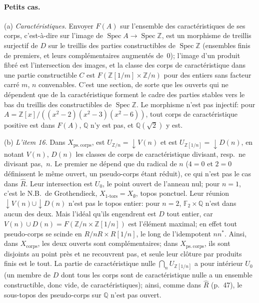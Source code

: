 \paragraph{Petits cas.} (a) \emph{Caractéristiques.} Envoyer $F(A)$ sur l'ensemble des caractéristiques de ses corps, c'est-à-dire sur l'image de $\operatorname{Spec}A\to\operatorname{Spec}\mathbb Z$, est un morphisme de treillis surjectif de $D$ sur le treillis des parties constructibles de $\operatorname{Spec}\mathbb Z$ (ensembles finis de premiers, et leurs complémentaires augmentés de~$0$); l'image d'un produit fibré est l'intersection des images, et la classe des corps de caractéristique dans une partie constructible $C$ est $F(\mathbb Z[1/m]\times\mathbb Z/n)$ pour des entiers sans facteur carré $m$, $n$ convenables. C'est une section, de sorte que les ouverts qui ne dépendent que de la caractéristique forment le cadre des parties stables vers le bas du treillis des constructibles de $\operatorname{Spec}\mathbb Z$. Le morphisme n'est pas injectif: pour $A = \mathbb Z[x]/((x^2-2)(x^2-3)(x^2-6))$, tout corps de caractéristique positive est dans $F(A)$, $\mathbb Q$ n'y est pas, et $\mathbb Q(\sqrt2)$ y est.

(b) \emph{L'item 16.} Dans $X_{\mathrm{ps.\,corps}}$,  est $U_{\mathbb Z/n} = {\downarrow}V(n)$ et  est $U_{\mathbb Z[1/n]} = {\downarrow}D(n)$, en notant $V(n)$, $D(n)$ les classes de corps de caractéristique divisant, resp.\ ne divisant pas,~$n$. Le premier ne dépend que du radical de $n$ ($4 = 0$ et $2 = 0$ définissent le même ouvert, un pseudo-corps étant réduit), ce qui n'est pas le cas dans $\widehat R$. Leur intersection est $U_0$, le point ouvert de l'anneau nul; pour $n = 1$, c'est le N.B.\ de Grothendieck, $X_{1\text{-tors}} = X_\emptyset$, topos ponctuel. Leur réunion ${\downarrow}V(n)\cup{\downarrow}D(n)$ n'est pas le topos entier: pour $n = 2$, $\mathbb F_2\times\mathbb Q$ n'est dans aucun des deux. Mais l'idéal qu'ils engendrent est $D$ tout entier, car $V(n)\cup D(n) = F(\mathbb Z/n\times\mathbb Z[1/n])$ est l'élément maximal; en effet tout pseudo-corps se scinde en $R/nR\times R[1/n]$, le long de l'idempotent $nn^*$. Ainsi, dans $X_{\mathrm{corps}}$, les deux ouverts sont complémentaires; dans $X_{\mathrm{ps.\,corps}}$, ils sont disjoints au point près et ne recouvrent pas, et seule leur clôture par produits finis est le tout. La partie de caractéristique nulle $\bigcap_nU_{\mathbb Z[1/n]}$ a pour intérieur $U_0$ (un membre de $D$ dont tous les corps sont de caractéristique nulle a un ensemble constructible, donc vide, de caractéristiques); ainsi, comme dans $\widehat R$ (p.~47), le sous-topos des pseudo-corps sur $\mathbb Q$ n'est pas ouvert.

